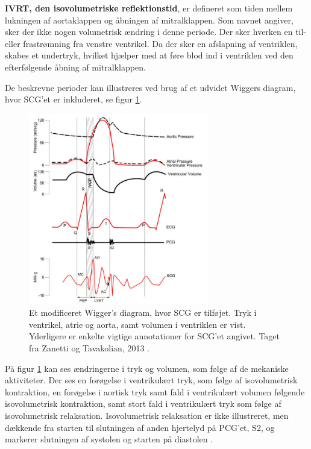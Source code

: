 \textbf{IVRT, den isovolumetriske reflektionstid}, er defineret som tiden mellem lukningen af aortaklappen og åbningen af mitralklappen. Som navnet angiver, sker der ikke nogen volumetrisk ændring i denne periode. Der sker hverken en til- eller frastrømning fra venstre ventrikel. Da der sker en afslapning af ventriklen, skabes et undertryk, hvilket hjælper med at føre blod ind i ventriklen ved den efterfølgende åbning af mitralklappen. \cite{di2013wearable}
 
De beskrevne perioder kan illustreres ved brug af et udvidet Wiggers diagram, hvor SCG’et er inkluderet, se figur \ref{wigdiagram}.

\begin{figure}[H]
\centering
  \includegraphics[width=0.7\textwidth]{Billeder/WiggersmedSCGZanetti.PNG}
   \caption{Et modificeret Wigger's diagram, hvor SCG er tilføjet. Tryk i ventrikel, atrie og aorta, samt volumen i ventriklen er vist. Yderligere er enkelte vigtige annotationer for SCG’et angivet. Taget fra Zanetti og Tavakolian, 2013 \cite{zanetti2013seismocardiography}.} 
   \label{wigdiagram}
\end{figure}

På figur \ref{wigdiagram} kan ses ændringerne i tryk og volumen, som følge af de mekaniske aktiviteter. Der ses en forøgelse i ventrikulært tryk, som følge af isovolumetrisk kontraktion, en forøgelse i aortisk tryk samt fald i ventrikulært volumen følgende isovolumetrisk kontraktion, samt stort fald i ventrikulært tryk som følge af isovolumetrisk relaksation. Isovolumetrisk relaksation er ikke illustreret, men dækkende fra starten til slutningen af anden hjertelyd på PCG’et, S2, og markerer slutningen af systolen og starten på diastolen \cite{zanetti2013seismocardiography}.


